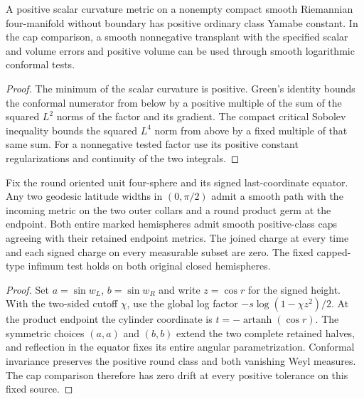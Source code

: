 \begin{proposition}
\label{prop:ed04-positive-class}
\leanok
A positive scalar curvature metric on a nonempty compact smooth
Riemannian four-manifold without boundary has positive ordinary
class Yamabe constant. In the cap comparison, a smooth nonnegative
transplant with the specified scalar and volume errors and positive
volume can be used through smooth logarithmic conformal tests.
\end{proposition}
\begin{proof}
\leanok
The minimum of the scalar curvature is positive. Green's identity
bounds the conformal numerator from below by a positive multiple of
the sum of the squared $L^2$ norms of the factor and its gradient.
The compact critical Sobolev inequality bounds the squared $L^4$
norm from above by a fixed multiple of that same sum. For a
nonnegative tested factor use its positive constant regularizations
and continuity of the two integrals.
\end{proof}

\begin{proposition}
\label{prop:ed04-round-face-control}
\leanok
Fix the round oriented unit four-sphere and its signed last-coordinate
equator. Any two geodesic latitude widths in $(0,\pi/2)$ admit a
smooth path with the incoming metric on the two outer collars and
a round product germ at the endpoint. Both entire marked hemispheres
admit smooth positive-class caps agreeing with their retained endpoint
metrics. The joined charge at every time and each signed charge on every
measurable subset are zero. The fixed capped-type infimum test holds on
both original closed hemispheres.
\end{proposition}
\begin{proof}
\leanok
Set $a=\sin w_L$, $b=\sin w_R$ and write $z=\cos r$ for the signed
height. With the two-sided cutoff $\chi$, use the global log factor
$-s\log(1-\chi z^2)/2$. At the product endpoint the cylinder coordinate
is $t=-\operatorname{artanh}(\cos r)$. The symmetric choices $(a,a)$
and $(b,b)$ extend the two complete retained halves, and reflection in
the equator fixes its entire angular parametrization. Conformal
invariance preserves the positive round class and both vanishing
Weyl measures. The cap comparison therefore has zero drift at every
positive tolerance on this fixed source.
\end{proof}

